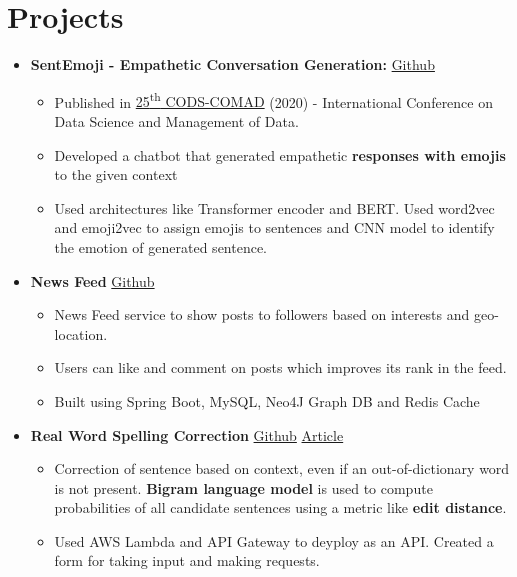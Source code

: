 \documentclass[letterpaper,11pt]{article}
\newcommand{\resumeItem}[1]{
    \item\small{
        {#1 \vspace{-2pt}}
    }
}
\newcommand{\resumeSubHeadingListStart}{\begin{itemize}[leftmargin=*]}
\newcommand{\resumeSubHeadingListEnd}{\end{itemize}}
\newcommand{\resumeItemListStart}{\begin{itemize}}
\newcommand{\resumeItemListEnd}{\end{itemize}\vspace{-5pt}}
\newcommand{\resumeProject}[1]{
  \vspace{-1pt}\item{#1}
    \vspace{-5pt}
}
\begin{document}
\section{Projects}
    \resumeSubHeadingListStart
        \resumeProject{\textbf{SentEmoji - Empathetic Conversation Generation:} \href{https://github.com/JatinDholakia/SentEmojiBot}{\color{blue}Github     }}
            \resumeItemListStart
                \resumeItem
                {Published in \href{https://dl.acm.org/doi/abs/10.1145/3371158.3371218}{\color{blue}25\textsuperscript{th} CODS-COMAD} (2020) - International Conference on Data Science and Management of Data.}
                \resumeItem
                {Developed a chatbot that generated empathetic \textbf{responses with emojis} to the given context}
                \resumeItem
                {Used architectures like Transformer encoder and BERT. Used word2vec and emoji2vec to assign emojis to sentences and CNN model to identify the emotion of generated sentence.}
            \resumeItemListEnd
        \resumeProject{\textbf{News Feed} \href{https://github.com/JatinDholakia/News-Feed} {\color{blue}Github}}
            \resumeItemListStart
                \resumeItem
                {News Feed service to show posts to followers based on interests and geo-location.} 
                \resumeItem
                {Users can like and comment on posts which improves its rank in the feed.}
                \resumeItem
                {Built using Spring Boot, MySQL, Neo4J Graph DB and Redis Cache}
            \resumeItemListEnd
        \resumeProject{\textbf{Real Word Spelling Correction} \href{https://github.com/JatinDholakia/Spelling-Correction}{\color{blue}Github} \href{https://medium.com/analytics-vidhya/real-word-spell-correction-c64a3a02c64d}{\color{blue}Article}}
            \resumeItemListStart
                \resumeItem
                {Correction of sentence based on context, even if an out-of-dictionary word is not present. \textbf{Bigram language model} is used to compute probabilities of all candidate sentences using a metric like \textbf{edit distance}.}
                \resumeItem
                {Used AWS Lambda and API Gateway to deyploy as an API. Created a form for taking input and making requests.}
            \resumeItemListEnd
    \resumeSubHeadingListEnd
\end{document}
